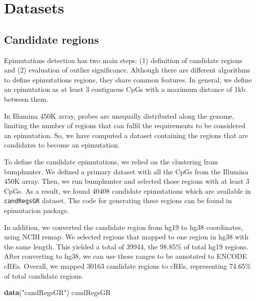 \documentclass[
]{article}
\newenvironment{Shaded}{\begin{snugshade}}{\end{snugshade}}
\newcommand{\KeywordTok}[1]{\textcolor[rgb]{0.13,0.29,0.53}{\textbf{#1}}}
\newcommand{\NormalTok}[1]{#1}
\newcommand{\StringTok}[1]{\textcolor[rgb]{0.31,0.60,0.02}{#1}}
\begin{document}
\hypertarget{datasets}{%
\section{Datasets}\label{datasets}}

\hypertarget{candidate-regions}{%
\subsection{Candidate regions}\label{candidate-regions}}

Epimutations detection has two main steps: (1) definition of candidate
regions and (2) evaluation of outlier significance. Although there are
different algorithms to define epimutations regions, they share common
features. In general, we define an epimutation as at least 3 contiguous
CpGs with a maximum distance of 1kb between them.

In Illumina 450K array, probes are unequally distributed along the
genome, limiting the number of regions that can fulfil the requirements
to be considered an epimutation. So, we have computed a dataset
containing the regions that are candidates to become an epimutation.

To define the candidate epimutations, we relied on the clustering from
bumphunter. We defined a primary dataset with all the CpGs from the
Illumina 450K array. Then, we run bumphunter and selected those regions
with at least 3 CpGs. As a result, we found 40408 candidate epimutations
which are available in \texttt{candRegsGR} dataset. The code for
generating these regions can be found in epimutacion package.

In addition, we converted the candidate region from hg19 to hg38
coordinates, using NCBI remap. We selected regions that mapped to one
region in hg38 with the same length. This yielded a total of 39944, the
98.85\% of total hg19 regions. After converting to hg38, we can use
these ranges to be annotated to ENCODE cREs. Overall, we mapped 30163
candidate regions to cREs, representing 74.65\% of total candidate
regions.

\begin{Shaded}
\begin{Highlighting}[]
\KeywordTok{data}\NormalTok{(}\StringTok{"candRegsGR"}\NormalTok{)}
\NormalTok{candRegsGR}
\end{Highlighting}
\end{Shaded}
\end{document}
